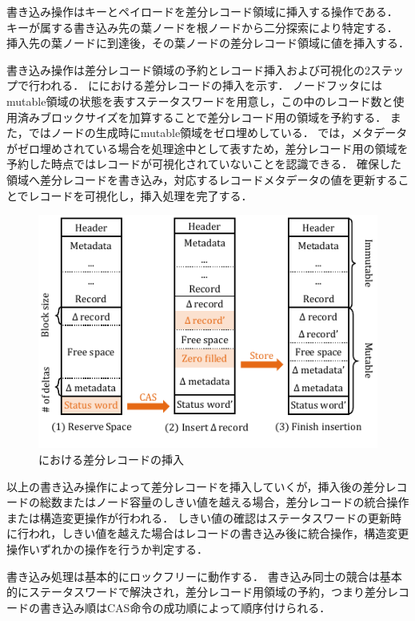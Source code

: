 書き込み操作はキーとペイロードを差分レコード領域に挿入する操作である．
キーが属する書き込み先の葉ノードを根ノードから二分探索により特定する．
挿入先の葉ノードに到達後，その葉ノードの差分レコード領域に値を挿入する．

書き込み操作は差分レコード領域の予約とレコード挿入および可視化の2ステップで行われる．
\Fig{\ref{fig:bc_tree_insertion}}に\Bctree{}における差分レコードの挿入を示す．
ノードフッタにはmutable領域の状態を表すステータスワードを用意し，この中のレコード数と使用済みブロックサイズを加算することで差分レコード用の領域を予約する．
また，\Bctree{}ではノードの生成時にmutable領域をゼロ埋めしている．
\Bctree{}では，メタデータがゼロ埋めされている場合を処理途中として表すため，差分レコード用の領域を予約した時点ではレコードが可視化されていないことを認識できる．
確保した領域へ差分レコードを書き込み，対応するレコードメタデータの値を更新することでレコードを可視化し，挿入処理を完了する．

\begin{figure}[t]
    \centering
    \includegraphics{./figures/Bc-insertion.pdf}
    \caption{\Bctree{}における差分レコードの挿入}
    \label{fig:bc_tree_insertion}
\end{figure}

以上の書き込み操作によって差分レコードを挿入していくが，挿入後の差分レコードの総数またはノード容量のしきい値を越える場合，差分レコードの統合操作または構造変更操作が行われる．
しきい値の確認はステータスワードの更新時に行われ，しきい値を越えた場合はレコードの書き込み後に統合操作，構造変更操作いずれかの操作を行うか判定する．

書き込み処理は基本的にロックフリーに動作する．
書き込み同士の競合は基本的にステータスワードで解決され，差分レコード用領域の予約，つまり差分レコードの書き込み順はCAS命令の成功順によって順序付けられる．

